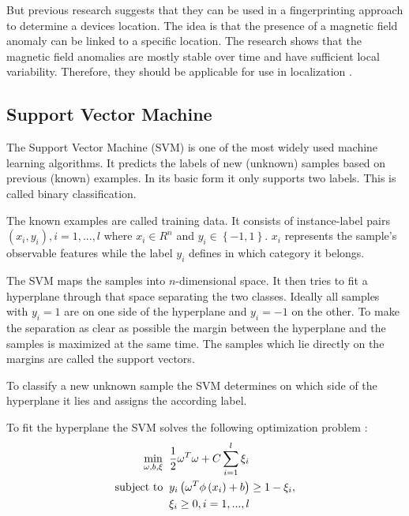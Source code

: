 But previous research suggests that they can be used in a fingerprinting approach to determine a devices location. The idea is that the presence of a magnetic field anomaly can be linked to a specific location. The research shows that the magnetic field anomalies are mostly stable over time and have sufficient local variability. Therefore, they should be applicable for use in localization \cite{haverinen2009global,angermann2012CharacterizationMagnetic,Li2012feasableMagnetic}.

\subsection{Support Vector Machine}
\label{theory:SVM}
The Support Vector Machine (SVM) is one of the most widely used machine learning algorithms. It predicts the labels of new (unknown) samples based on previous (known) examples. In its basic form it only supports two labels. This is called binary classification.

The known examples are called training data. It consists of instance-label pairs \(\left ( x_{i}, y_{i} \right ), i=1,...,l\) where \(x_{i}\in R^{n}\) and \(y_{i}\in \left \{ -1,1 \right \}\). \(x_{i}\) represents the sample's observable features while the label \(y_{i}\) defines in which category it belongs.

The SVM maps the samples into \(n\)-dimensional space. It then tries to fit a hyperplane through that space separating the two classes. Ideally all samples with \(y_{i}=1\) are on one side of the hyperplane and \(y_{i}=-1\) on the other. To make the separation as clear as possible the margin between the hyperplane and the samples is maximized at the same time. The samples which lie directly on the margins are called the support vectors.

To classify a new unknown sample the SVM determines on which side of the hyperplane it lies and assigns the according label.

To fit the hyperplane the SVM solves the following optimization problem \cite{chang2011libsvm}:
\begin{equation}
\begin{split}
\min_{\omega , b ,\xi}\;\; & \frac{1}{2}\omega^{T}\omega +C\sum_{i=1}^{l}\xi_{i}\\
\textup{subject to}\;\; & y_{i}\left ( \omega^{T}\phi \left ( x_{i} \right )+b \right )\geq 1-\xi_{i},\\
& \xi_{i}\geq 0,i=1,...,l
\end{split}
\end{equation}

